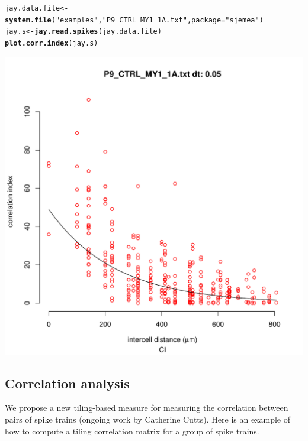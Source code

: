 \documentclass{article}\usepackage[]{graphicx}\usepackage[]{color}
\makeatletter
\def\maxwidth{ %
  \ifdim\Gin@nat@width>\linewidth
    \linewidth
  \else
    \Gin@nat@width
  \fi
}
\newcommand{\hlstr}[1]{\textcolor[rgb]{0.192,0.494,0.8}{#1}}%
\newcommand{\hlstd}[1]{\textcolor[rgb]{0.345,0.345,0.345}{#1}}%
\newcommand{\hlkwb}[1]{\textcolor[rgb]{0.69,0.353,0.396}{#1}}%
\newcommand{\hlkwc}[1]{\textcolor[rgb]{0.333,0.667,0.333}{#1}}%
\newcommand{\hlkwd}[1]{\textcolor[rgb]{0.737,0.353,0.396}{\textbf{#1}}}%
\newenvironment{kframe}{%
 \def\at@end@of@kframe{}%
 \ifinner\ifhmode%
  \def\at@end@of@kframe{\end{minipage}}%
  \begin{minipage}{\columnwidth}%
 \fi\fi%
 \def\FrameCommand##1{\hskip\@totalleftmargin \hskip-\fboxsep
 \colorbox{shadecolor}{##1}\hskip-\fboxsep
     \hskip-\linewidth \hskip-\@totalleftmargin \hskip\columnwidth}%
 \MakeFramed {\advance\hsize-\width
   \@totalleftmargin\z@ \linewidth\hsize
   \@setminipage}}%
 {\par\unskip\endMakeFramed%
 \at@end@of@kframe}
\newenvironment{knitrout}{}{} %
\makeatother
\begin{document}
\begin{knitrout}
\color{fgcolor}\begin{kframe}
\begin{alltt}
\hlstd{jay.data.file} \hlkwb{<-} \hlkwd{system.file}\hlstd{(}\hlstr{"examples"}\hlstd{,} \hlstr{"P9_CTRL_MY1_1A.txt"}\hlstd{,} \hlkwc{package} \hlstd{=} \hlstr{"sjemea"}\hlstd{)}
\hlstd{jay.s} \hlkwb{<-} \hlkwd{jay.read.spikes}\hlstd{(jay.data.file)}
\hlkwd{plot.corr.index}\hlstd{(jay.s)}
\end{alltt}


{\ttfamily\noindent\color{warningcolor}{\#\# Warning: removing 17 zero entries}}\end{kframe}
\includegraphics[width=\maxwidth]{figure/correlation-index} 

\end{knitrout}


\subsection*{Correlation analysis}

We propose a new tiling-based measure for measuring the correlation
between pairs of spike trains (ongoing work by Catherine Cutts).  Here
is an example of how to compute a tiling correlation matrix for a
group of spike trains.
\end{document}
